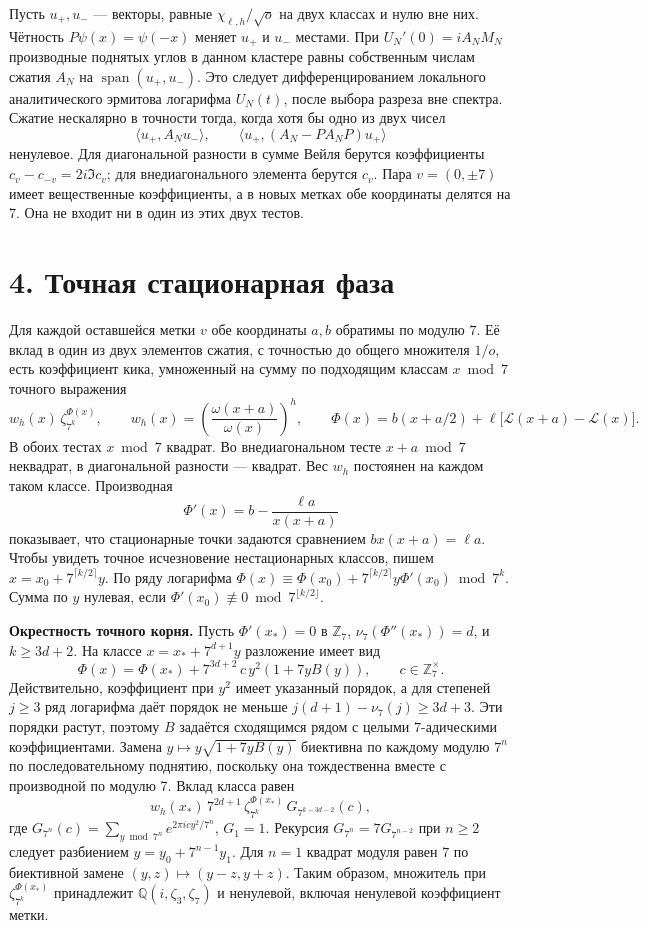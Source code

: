 \documentclass[11pt,a4paper]{article}
\newcommand{\sect}[1]{\section*{\sffamily\color{ink}#1}}
\newcommand{\subt}[1]{\par\medskip\noindent\textbf{#1.}\quad}
\newcommand{\zp}{\mathbb Z_7}
\newcommand{\QQ}{\mathbb Q}
\begin{document}
Пусть \(u_+,u_-\) --- векторы, равные \(\chi_{\ell,h}/\sqrt{o}\) на двух классах и нулю вне них. Чётность \(P\psi(x)=\psi(-x)\) меняет \(u_+\) и \(u_-\) местами. При \(U_N'(0)=i A_N M_N\) производные поднятых углов в данном кластере равны собственным числам сжатия \(A_N\) на \(\operatorname{span}(u_+,u_-)\). Это следует дифференцированием локального аналитического эрмитова логарифма \(U_N(t)\), после выбора разреза вне спектра. Сжатие нескалярно в точности тогда, когда хотя бы одно из двух чисел
\[
         \langle u_+,A_Nu_-\rangle,\qquad
         \langle u_+,(A_N-PA_NP)u_+\rangle
\]
ненулевое. Для диагональной разности в сумме Вейля берутся коэффициенты \(c_v-c_{-v}=2i\Im c_v\); для внедиагонального элемента берутся \(c_v\). Пара \(v=(0,\pm7)\) имеет вещественные коэффициенты, а в новых метках обе координаты делятся на \(7\). Она не входит ни в один из этих двух тестов.
\newpage
\sect{4. Точная стационарная фаза}
Для каждой оставшейся метки \(v\) обе координаты \(a,b\) обратимы по модулю \(7\). Её вклад в один из двух элементов сжатия, с точностью до общего множителя \(1/o\), есть коэффициент кика, умноженный на сумму по подходящим классам \(x\bmod7\) точного выражения
\[
  w_h(x)\,\zeta_{7^k}^{\Phi(x)},\qquad
  w_h(x)=\left(\frac{\omega(x+a)}{\omega(x)}\right)^h,\qquad
  \Phi(x)=b(x+a/2)+\ell\big[\mathcal L(x+a)-\mathcal L(x)\big].
\]
В обоих тестах \(x\bmod7\) квадрат. Во внедиагональном тесте \(x+a\bmod7\) неквадрат, в диагональной разности --- квадрат. Вес \(w_h\) постоянен на каждом таком классе. Производная
\[
                 \Phi'(x)=b-\frac{\ell a}{x(x+a)}
\]
показывает, что стационарные точки задаются сравнением \(b x(x+a)=\ell a\). Чтобы увидеть точное исчезновение нестационарных классов, пишем \(x=x_0+7^{\lceil k/2\rceil}y\). По ряду логарифма \(\Phi(x)\equiv\Phi(x_0)+7^{\lceil k/2\rceil}y\Phi'(x_0)\bmod7^k\). Сумма по \(y\) нулевая, если \(\Phi'(x_0)\not\equiv0\bmod7^{\lfloor k/2\rfloor}\).

\subt{Окрестность точного корня}
Пусть \(\Phi'(x_*)=0\) в \(\zp\), \(\nu_7(\Phi''(x_*))=d\), и \(k\ge 3d+2\). На классе \(x=x_*+7^{d+1}y\) разложение имеет вид
\[
 \Phi(x)=\Phi(x_*)+7^{3d+2}\,c\, y^2(1+7 y B(y)),
       \qquad c\in\zp^\times .
\]
Действительно, коэффициент при \(y^2\) имеет указанный порядок, а для степеней \(j\ge3\) ряд логарифма даёт порядок не меньше \(j(d+1)-\nu_7(j)\ge 3d+3\). Эти порядки растут, поэтому \(B\) задаётся сходящимся рядом с целыми \(7\)-адическими коэффициентами. Замена \(y\mapsto y\sqrt{1+7yB(y)}\) биективна по каждому модулю \(7^n\) по последовательному поднятию, поскольку она тождественна вместе с производной по модулю 7. Вклад класса равен
\[
         w_h(x_*)\,7^{2d+1}\,\zeta_{7^k}^{\Phi(x_*)}\,
                     G_{7^{k-3d-2}}(c),                        \tag{2}
\]
где \(G_{7^n}(c)=\sum_{y\bmod7^n} e^{2\pi i c y^2/7^n}\), \(G_1=1\). Рекурсия \(G_{7^n}=7G_{7^{n-2}}\) при \(n\ge2\) следует разбиением \(y=y_0+7^{n-1}y_1\). Для \(n=1\) квадрат модуля равен \(7\) по биективной замене \((y,z)\mapsto(y-z,y+z)\). Таким образом, множитель при \(\zeta_{7^k}^{\Phi(x_*)}\) принадлежит \(\QQ(i,\zeta_3,\zeta_7)\) и ненулевой, включая ненулевой коэффициент метки.
\end{document}
